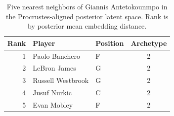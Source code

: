 \begin{table}[htbp]
  \centering\small
  \begin{tabular}{rllc}
    \toprule
    Rank & Player & Position & Archetype \\
    \midrule
    1 & Paolo Banchero & F & 2 \\
    2 & LeBron James & G & 2 \\
    3 & Russell Westbrook & G & 2 \\
    4 & Jusuf Nurkic & C & 2 \\
    5 & Evan Mobley & F & 2 \\
    \bottomrule
  \end{tabular}
  \caption{Five nearest neighbors of Giannis Antetokounmpo in the Procrustes-aligned posterior latent space. Rank is by posterior mean embedding distance.}
  \label{tab:Giannis_Antetokounmpo_neighbors}
\end{table}

